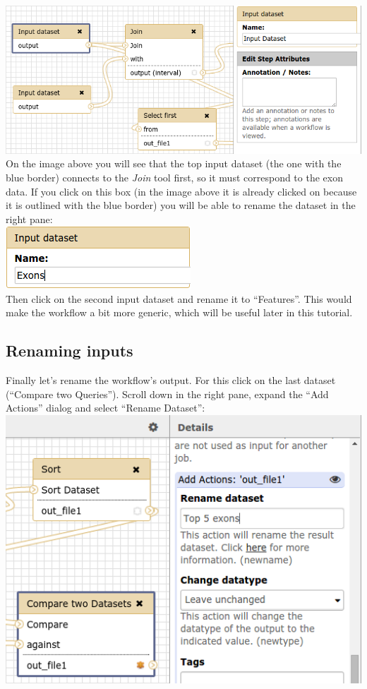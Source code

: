 \documentclass[11pt,a4paper]{article}
\begin{document}
\includegraphics[scale=0.55]{figures/101_32}\\
On the image above you will see that the top input dataset (the one with the blue border) connects to the \textit{Join} tool first, so it must correspond to the exon data. If you click on this box (in the image above it is already clicked on because it is outlined with the blue border) you will be able to rename the dataset in the right pane:\\

\includegraphics[scale=0.55]{figures/101_33}\\
Then click on the second input dataset and rename it to ``Features''. This would make the workflow a bit more generic, which will be useful later in this tutorial.
\subsection{Renaming inputs}
Finally let's rename the workflow's output. For this click on the last dataset (``Compare two Queries''). Scroll down in the right pane, expand the ``Add Actions'' dialog and select ``Rename Dataset'':\\

\includegraphics[scale=0.55]{figures/101_34}\\
\end{document}
